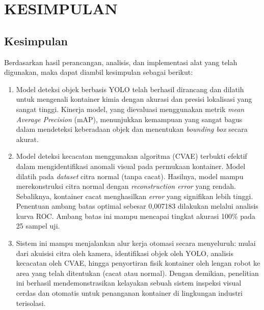 \chapter{KESIMPULAN}
\section{Kesimpulan}
Berdasarkan hasil perancangan, analisis, dan implementasi alat yang
telah digunakan, maka dapat diambil kesimpulan sebagai berikut:
\begin{enumerate}
  \item Model deteksi objek berbasis YOLO telah berhasil dirancang dan
    dilatih untuk mengenali kontainer kimia dengan akurasi dan
    presisi lokalisasi yang sangat tinggi. Kinerja model, yang
    dievaluasi menggunakan metrik \textit{mean Average Precision} (mAP),
    menunjukkan kemampuan yang sangat bagus dalam mendeteksi
    keberadaan objek dan menentukan \textit{bounding box} secara akurat.
  \item Model deteksi kecacatan menggunakan algoritma (CVAE) terbukti
    efektif dalam mengidentifikasi anomali visual pada permukaan
    kontainer. Model
    dilatih pada \textit{dataset} citra normal (tanpa cacat). Hasilnya, model
    mampu merekonstruksi citra normal dengan \textit{reconstruction
    error} yang rendah. Sebaliknya, kontainer cacat menghasilkan \textit{error}
    yang signifikan lebih tinggi. Penentuan ambang batas optimal sebesar
    0,007183 dilakukan melalui analisis kurva ROC. Ambang batas ini
    mampu mencapai tingkat akurasi 100\% pada 25 sampel uji.
  \item Sistem ini mampu menjalankan alur kerja otomasi secara
    menyeluruh: mulai dari akuisisi citra oleh kamera, identifikasi
    objek oleh YOLO, analisis kecacatan oleh CVAE, hingga penyortiran
    fisik kontainer oleh lengan robot ke area yang telah ditentukan
    (cacat atau normal). Dengan demikian, penelitian ini berhasil
    mendemonstrasikan kelayakan sebuah sistem inspeksi visual cerdas
    dan otomatis untuk penanganan kontainer di lingkungan industri terisolasi.
\end{enumerate}

\vspace{1em}

